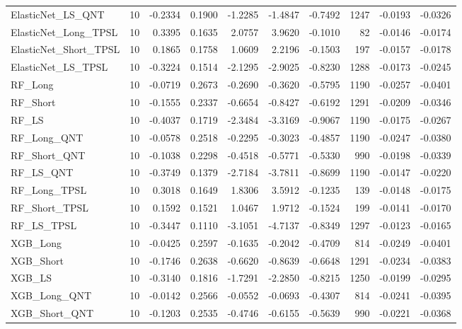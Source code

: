 \begin{tabular}{llrrrrrrrr}
\cline{1-10}
ElasticNet\_LS\_QNT & 10 & -0.2334 & 0.1900 & -1.2285 & -1.4847 & -0.7492 & 1247 & -0.0193 & -0.0326 \\
\cline{1-10}
ElasticNet\_Long\_TPSL & 10 & 0.3395 & 0.1635 & 2.0757 & 3.9620 & -0.1010 & 82 & -0.0146 & -0.0174 \\
\cline{1-10}
ElasticNet\_Short\_TPSL & 10 & 0.1865 & 0.1758 & 1.0609 & 2.2196 & -0.1503 & 197 & -0.0157 & -0.0178 \\
\cline{1-10}
ElasticNet\_LS\_TPSL & 10 & -0.3224 & 0.1514 & -2.1295 & -2.9025 & -0.8230 & 1288 & -0.0173 & -0.0245 \\
\cline{1-10}
RF\_Long & 10 & -0.0719 & 0.2673 & -0.2690 & -0.3620 & -0.5795 & 1190 & -0.0257 & -0.0401 \\
\cline{1-10}
RF\_Short & 10 & -0.1555 & 0.2337 & -0.6654 & -0.8427 & -0.6192 & 1291 & -0.0209 & -0.0346 \\
\cline{1-10}
RF\_LS & 10 & -0.4037 & 0.1719 & -2.3484 & -3.3169 & -0.9067 & 1190 & -0.0175 & -0.0267 \\
\cline{1-10}
RF\_Long\_QNT & 10 & -0.0578 & 0.2518 & -0.2295 & -0.3023 & -0.4857 & 1190 & -0.0247 & -0.0380 \\
\cline{1-10}
RF\_Short\_QNT & 10 & -0.1038 & 0.2298 & -0.4518 & -0.5771 & -0.5330 & 990 & -0.0198 & -0.0339 \\
\cline{1-10}
RF\_LS\_QNT & 10 & -0.3749 & 0.1379 & -2.7184 & -3.7811 & -0.8699 & 1190 & -0.0147 & -0.0220 \\
\cline{1-10}
RF\_Long\_TPSL & 10 & 0.3018 & 0.1649 & 1.8306 & 3.5912 & -0.1235 & 139 & -0.0148 & -0.0175 \\
\cline{1-10}
RF\_Short\_TPSL & 10 & 0.1592 & 0.1521 & 1.0467 & 1.9712 & -0.1524 & 199 & -0.0141 & -0.0170 \\
\cline{1-10}
RF\_LS\_TPSL & 10 & -0.3447 & 0.1110 & -3.1051 & -4.7137 & -0.8349 & 1297 & -0.0123 & -0.0165 \\
\cline{1-10}
XGB\_Long & 10 & -0.0425 & 0.2597 & -0.1635 & -0.2042 & -0.4709 & 814 & -0.0249 & -0.0401 \\
\cline{1-10}
XGB\_Short & 10 & -0.1746 & 0.2638 & -0.6620 & -0.8639 & -0.6648 & 1291 & -0.0234 & -0.0383 \\
\cline{1-10}
XGB\_LS & 10 & -0.3140 & 0.1816 & -1.7291 & -2.2850 & -0.8215 & 1250 & -0.0199 & -0.0295 \\
\cline{1-10}
XGB\_Long\_QNT & 10 & -0.0142 & 0.2566 & -0.0552 & -0.0693 & -0.4307 & 814 & -0.0241 & -0.0395 \\
\cline{1-10}
XGB\_Short\_QNT & 10 & -0.1203 & 0.2535 & -0.4746 & -0.6155 & -0.5639 & 990 & -0.0221 & -0.0368 \\

\end{tabular}
